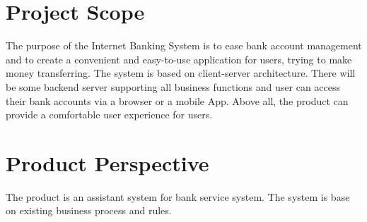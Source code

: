 \documentclass{scrreprt}
\begin{document}
\section{Project Scope}
The purpose of the Internet Banking System is to ease bank account management and to create a convenient and easy-to-use application for users, trying to make money transferring. The system is based on client-server architecture. There will be some backend server supporting all business functions and user can access their bank accounts via a browser or a mobile App. Above all, the product can provide a comfortable user experience for users.





\section{Product Perspective}
The product is an assistant system for bank service system. The system is base on existing business process and rules. 
\end{document}

